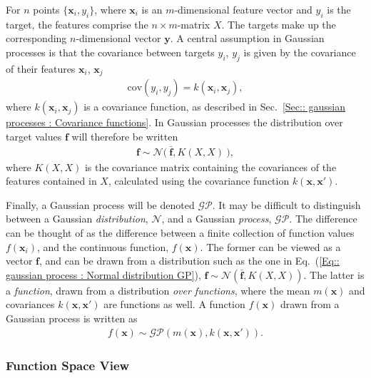 \documentclass[twoside,english]{uiofysmaster}
\begin{document}
For $n$ points $\{\textbf{x}_i , y_i\}$, where $\textbf{x}_i$ is an $m$-dimensional feature vector and $y_i$ is the target, the features comprise the $n \times m$-matrix $X$. The targets make up the corresponding $n$-dimensional vector $\textbf{y}$. A central assumption in Gaussian processes is that the covariance between targets $y_i$, $y_j$ is given by the covariance of their features $\textbf{x}_i$, $\textbf{x}_j$
\begin{align}
\text{cov}(y_i, y_j) = k(\textbf{x}_i, \textbf{x}_j),
\end{align}
where $k(\textbf{x}_i, \textbf{x}_j)$ is a covariance function, as described in Sec.~\ref{Sec:: gaussian processes : Covariance functions}. In Gaussian processes the distribution over target values $\textbf{f}$ will therefore be written
\begin{align}\label{Eq:: gaussian process : Normal distribution GP}
\textbf{f} \sim \mathcal{N} \big(~\bar{ \textbf{f} }, K(X, X) ~\big),
\end{align}
where $K(X,X)$ is the covariance matrix containing the covariances of the features contained in $X$, calculated using the covariance function $k(\textbf{x}, \textbf{x}')$.

Finally, a Gaussian process will be denoted $\mathcal{GP}$. It may be difficult to distinguish between a Gaussian \textit{distribution}, $\mathcal{N}$, and a Gaussian \textit{process}, $\mathcal{GP}$. The difference can be thought of as the difference between a finite collection of function values $f(\textbf{x}_i)$, and the continuous function, $f(\textbf{x})$. The former can be viewed as a vector $\textbf{f}$, and can be drawn from a distribution such as the one in Eq.~(\ref{Eq:: gaussian process : Normal distribution GP}), $\textbf{f} \sim \mathcal{N}(\bar{ \textbf{f} }, K(X, X))$. The latter is a \textit{function}, drawn from a distribution \textit{over functions}, where the mean $m(\textbf{x})$ and covariances $k(\textbf{x}, \textbf{x}')$ are functions as well. A function $f(\textbf{x})$ drawn from a Gaussian process is written as 
\begin{align}
f(\textbf{x}) \sim \mathcal{GP} (m(\textbf{x}), k(\textbf{x}, \textbf{x}')).
\end{align}

\subsubsection{Function Space View}
\end{document}
